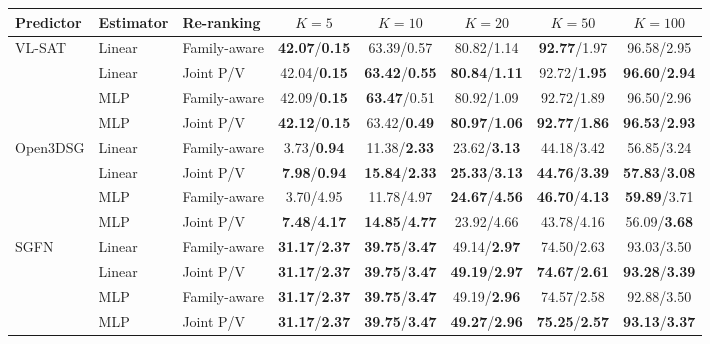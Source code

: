 \begin{minipage}{\textwidth}
\centering
{\small
\setlength{\tabcolsep}{3.0pt}
\begin{tabular}{@{}lllccccc@{}}
\toprule
Predictor & Estimator & Re-ranking & \(K=5\) & \(K=10\) & \(K=20\) &
\(K=50\) & \(K=100\) \\
\midrule
\multirow{4}{*}{VL-SAT}
 & Linear & Family-aware & \textbf{42.07}/\textbf{0.15} & 63.39/0.57 & 80.82/1.14 & \textbf{92.77}/1.97 & 96.58/2.95 \\
 & Linear & Joint P/V  & 42.04/\textbf{0.15} & \textbf{63.42}/\textbf{0.55} & \textbf{80.84}/\textbf{1.11} & 92.72/\textbf{1.95} & \textbf{96.60}/\textbf{2.94} \\
 & MLP & Family-aware    & 42.09/\textbf{0.15} & \textbf{63.47}/0.51 & 80.92/1.09 & 92.72/1.89 & 96.50/2.96 \\
 & MLP & Joint P/V     & \textbf{42.12}/\textbf{0.15} & 63.42/\textbf{0.49} & \textbf{80.97}/\textbf{1.06} & \textbf{92.77}/\textbf{1.86} & \textbf{96.53}/\textbf{2.93} \\
\midrule
\multirow{4}{*}{Open3DSG}
 & Linear & Family-aware & 3.73/\textbf{0.94} & 11.38/\textbf{2.33} & 23.62/\textbf{3.13} & 44.18/3.42 & 56.85/3.24 \\
 & Linear & Joint P/V  & \textbf{7.98}/\textbf{0.94} & \textbf{15.84}/\textbf{2.33} & \textbf{25.33}/\textbf{3.13} & \textbf{44.76}/\textbf{3.39} & \textbf{57.83}/\textbf{3.08} \\
 & MLP & Family-aware    & 3.70/4.95 & 11.78/4.97 & \textbf{24.67}/\textbf{4.56} & \textbf{46.70}/\textbf{4.13} & \textbf{59.89}/3.71 \\
 & MLP & Joint P/V     & \textbf{7.48}/\textbf{4.17} & \textbf{14.85}/\textbf{4.77} & 23.92/4.66 & 43.78/4.16 & 56.09/\textbf{3.68} \\
\midrule
\multirow{4}{*}{SGFN}
 & Linear & Family-aware & \textbf{31.17}/\textbf{2.37} & \textbf{39.75}/\textbf{3.47} & 49.14/\textbf{2.97} & 74.50/2.63 & 93.03/3.50 \\
 & Linear & Joint P/V  & \textbf{31.17}/\textbf{2.37} & \textbf{39.75}/\textbf{3.47} & \textbf{49.19}/\textbf{2.97} & \textbf{74.67}/\textbf{2.61} & \textbf{93.28}/\textbf{3.39} \\
 & MLP & Family-aware    & \textbf{31.17}/\textbf{2.37} & \textbf{39.75}/\textbf{3.47} & 49.19/\textbf{2.96} & 74.57/2.58 & 92.88/3.50 \\
 & MLP & Joint P/V     & \textbf{31.17}/\textbf{2.37} & \textbf{39.75}/\textbf{3.47} & \textbf{49.27}/\textbf{2.96} & \textbf{75.25}/\textbf{2.57} & \textbf{93.13}/\textbf{3.37} \\
\bottomrule
\end{tabular}
}
\label{tab:routing-constraint}
\end{minipage}

